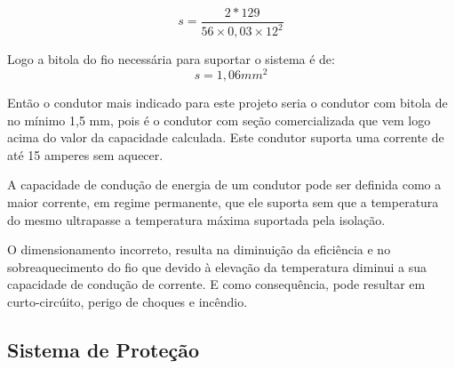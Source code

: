 \begin{equation}
s= \frac{2*129}{56 \times 0,03\times {12}^{2}}
\end{equation}
\par Logo a bitola do fio necessária para suportar o sistema é de:
\begin{equation}
s= 1,06 mm^2
\end{equation}
\par Então o condutor mais indicado para este projeto seria o condutor com bitola de no mínimo 1,5 mm, pois é o condutor com seção comercializada que vem logo acima do valor da capacidade calculada. Este condutor suporta uma corrente de até 15 amperes sem aquecer.
\par A capacidade de condução de energia de um condutor pode ser definida como  a maior corrente, em regime permanente, que ele suporta sem que a temperatura do mesmo ultrapasse a temperatura máxima suportada pela isolação.
\par O dimensionamento incorreto, resulta na diminuição da eficiência e no sobreaquecimento do fio que devido à elevação da temperatura diminui a sua capacidade de condução de corrente. E como consequência, pode resultar em curto-circúito, perigo de choques e incêndio.

\subsection{Sistema de Proteção}

